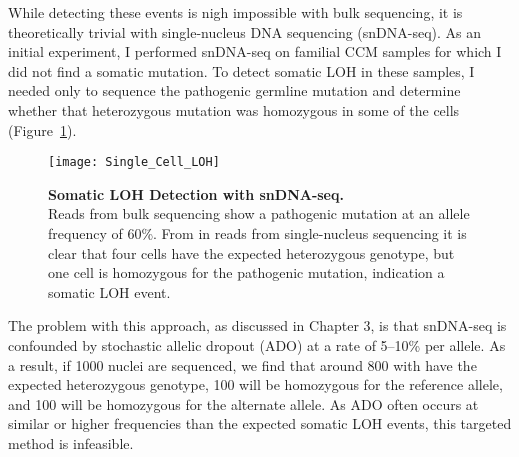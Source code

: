 While detecting these events is nigh impossible with bulk sequencing, it is theoretically trivial with single-nucleus DNA sequencing (snDNA-seq). As an initial experiment, I performed snDNA-seq on familial CCM samples for which I did not find a somatic mutation. To detect somatic LOH in these samples, I needed only to sequence the pathogenic germline mutation and determine whether that heterozygous mutation was homozygous in some of the cells (Figure~\ref{Single_Cell_LOH}).
\begin{figure}[tbp!]
\begin{center}
\texttt{[image: Single\_Cell\_LOH]}
\end{center}
\caption[Somatic LOH Detection with snDNA-seq]{\textbf{Somatic LOH Detection with snDNA-seq.} \\  Reads from bulk sequencing show a pathogenic mutation at an allele frequency of 60\%. From in reads from single-nucleus sequencing it is clear that four cells have the expected heterozygous genotype, but one cell is homozygous for the pathogenic mutation, indication a somatic LOH event. }
\label{Single_Cell_LOH}
\end{figure}
The problem with this approach, as discussed in Chapter 3, is that snDNA-seq is confounded by stochastic allelic dropout (ADO) at a rate of 5--10\% per allele. As a result, if 1000 nuclei are sequenced, we find that around 800 with have the expected heterozygous genotype, 100 will be homozygous for the reference allele, and 100 will be homozygous for the alternate allele. As ADO often occurs at similar or higher frequencies than the expected somatic LOH events, this targeted method is infeasible. 

